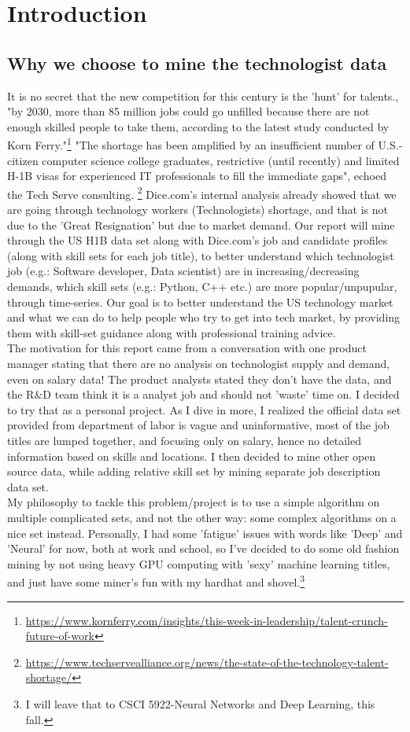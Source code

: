 

\section{Introduction} 
\subsection{Why we choose to mine the technologist data}
 It is no secret that the new competition for this century is the 'hunt' for talents., "by 2030, more than 85 million jobs could go unfilled because there are not enough skilled people to take them, according to the latest study conducted by Korn Ferry."\footnote{ \url{https://www.kornferry.com/insights/this-week-in-leadership/talent-crunch-future-of-work}} "The shortage has been amplified by an insufficient number of U.S.-citizen computer science college graduates, restrictive (until recently) and limited H-1B visas for experienced IT professionals to fill the immediate gaps",  echoed the Tech Serve consulting. \footnote{ \url{https://www.techservealliance.org/news/the-state-of-the-technology-talent-shortage/}}
Dice.com's internal analysis already showed that we are going through technology workers (Technologists) shortage, and that is not due to the 'Great Resignation' but due to market demand. Our report will mine through the US H1B data set along with Dice.com's job and candidate profiles (along with skill sets for each job title),  to better understand which technologist job (e.g.: Software developer, Data scientist) are in increasing/decreasing demands, which skill sets (e.g.: Python, C++ etc.) are more popular/unpupular, through time-series. Our goal is to better understand the US technology market and what we can do to help people who try to get into tech market, by providing them with skill-set guidance along with professional training advice. \\
The motivation for this report came from a conversation with one product manager stating that there are no analysis on technologist supply and demand, even on salary data! The product analysts stated they don't have the data, and the R$\&$D team think it is a analyst job and should not 'waste' time on.  I decided to try that as a personal project. As I dive in more, I realized the official data set provided from department of labor is vague and uninformative, most of the job titles are lumped together, and focusing only on salary, hence no detailed information based on skills and locations. I then decided to mine other open source data, while adding relative skill set by mining separate job description data set.\\
My philosophy to tackle this problem/project is to use a simple algorithm on multiple complicated sets, and not the other way: some complex algorithms  on a nice set instead. Personally, I had some 'fatigue' issues with words like 'Deep' and 'Neural' for now, both at work and school, so I've decided to do some old fashion mining by not using heavy GPU computing with 'sexy' machine learning titles, and just have some miner's fun with my hardhat and shovel.\footnote{I will leave that to CSCI 5922-Neural Networks and Deep Learning, this fall.}

